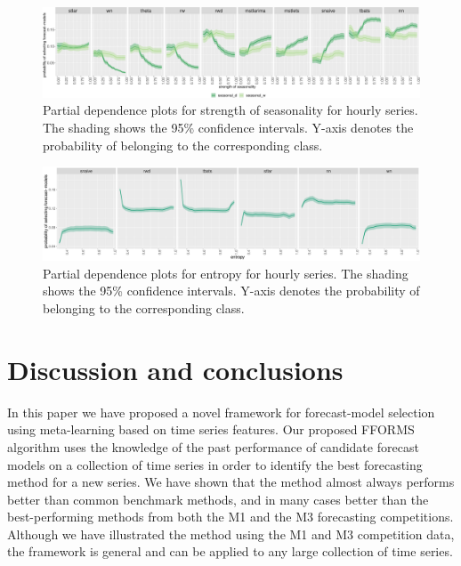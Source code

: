 \documentclass[11pt,a4paper,]{article}
\begin{document}
\begin{figure}[h]

{\centering \includegraphics[width=\textwidth]{figure/seasonalityhourly-1} 

}

\caption{Partial dependence plots for strength of seasonality for hourly series. The shading shows the 95\% confidence intervals. Y-axis denotes the probability of belonging to the corresponding class.}\label{fig:seasonalityhourly}
\end{figure}

\begin{figure}[h]

{\centering \includegraphics[width=\textwidth]{figure/entropyhourly-1} 

}

\caption{Partial dependence plots for entropy for hourly series. The shading shows the 95\% confidence intervals. Y-axis denotes the probability of belonging to the corresponding class.}\label{fig:entropyhourly}
\end{figure}

\clearpage

\hypertarget{discussion}{%
\section{Discussion and conclusions}\label{discussion}}

In this paper we have proposed a novel framework for forecast-model selection using meta-learning based on time series features. Our proposed FFORMS algorithm uses the knowledge of the past performance of candidate forecast models on a collection of time series in order to identify the best forecasting method for a new series. We have shown that the method almost always performs better than common benchmark methods, and in many cases better than the best-performing methods from both the M1 and the M3 forecasting competitions. Although we have illustrated the method using the M1 and M3 competition data, the framework is general and can be applied to any large collection of time series.
\end{document}
